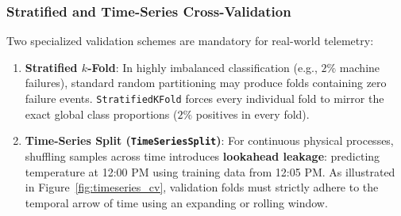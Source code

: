 \subsubsection{Stratified and Time-Series Cross-Validation}

Two specialized validation schemes are mandatory for real-world telemetry:
\begin{enumerate}
    \item \textbf{Stratified $k$-Fold}: In highly imbalanced classification (e.g., $2\%$ machine failures), standard random partitioning may produce folds containing zero failure events. \texttt{StratifiedKFold} forces every individual fold to mirror the exact global class proportions ($2\%$ positives in every fold).
    \item \textbf{Time-Series Split (\texttt{TimeSeriesSplit})}: For continuous physical processes, shuffling samples across time introduces \textbf{lookahead leakage}: predicting temperature at 12:00 PM using training data from 12:05 PM. As illustrated in Figure~\ref{fig:timeseries_cv}, validation folds must strictly adhere to the temporal arrow of time using an expanding or rolling window.
\end{enumerate}

